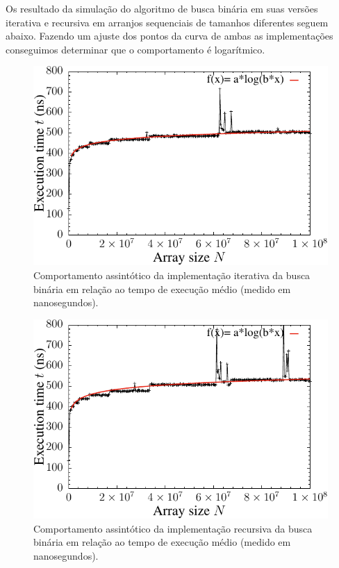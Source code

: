 Os resultado da simulação do algoritmo de busca binária em suas versões iterativa e recursiva em arranjos sequenciais de tamanhos diferentes seguem abaixo. Fazendo um ajuste dos pontos da curva de ambas as implementações conseguimos determinar que o comportamento é logarítmico.
\begin{figure}[H]
  \centering
  \includegraphics[scale=1.2]{../plots/bsearch_it_time.pdf}
  \caption{Comportamento assintótico da implementação iterativa da busca binária em relação ao tempo de execução médio (medido em nanosegundos).}
\end{figure} \label{fig:bseach_it_time}

\begin{figure}[H]
  \centering
  \includegraphics[scale=1.2]{../plots/bsearch_rec_time.pdf}
  \caption{Comportamento assintótico da implementação recursiva da busca binária em relação ao tempo de execução médio (medido em nanosegundos).}
\end{figure} \label{fig:bseach_rec_time}


